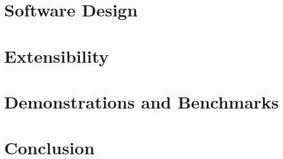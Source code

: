 \documentclass[a4paper, 11pt]{article}
\begin{document}
\section{Software Design}

\section{Extensibility}

\section{Demonstrations and Benchmarks}

\section{Conclusion}


\end{document}
